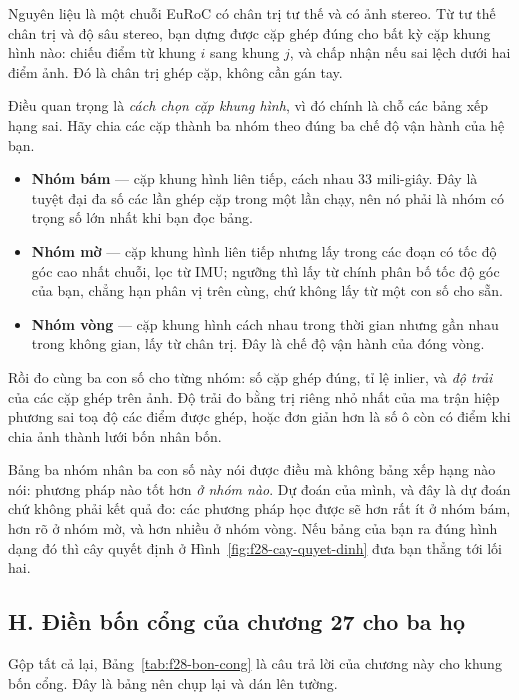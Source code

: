 \documentclass[../../deep_learning.tex]{subfiles}
\begin{document}
Nguyên liệu là một chuỗi EuRoC có chân trị tư thế và có ảnh stereo. Từ tư thế chân trị và độ sâu stereo, bạn dựng được cặp ghép đúng cho bất kỳ cặp khung hình nào: chiếu điểm từ khung \(i\) sang khung \(j\), và chấp nhận nếu sai lệch dưới hai điểm ảnh. Đó là chân trị ghép cặp, không cần gán tay.

Điều quan trọng là \emph{cách chọn cặp khung hình}, vì đó chính là chỗ các bảng xếp hạng sai. Hãy chia các cặp thành ba nhóm theo đúng ba chế độ vận hành của hệ bạn.

\begin{itemize}
\item \textbf{Nhóm bám} --- cặp khung hình liên tiếp, cách nhau 33 mili-giây. Đây là tuyệt đại đa số các lần ghép cặp trong một lần chạy, nên nó phải là nhóm có trọng số lớn nhất khi bạn đọc bảng.
\item \textbf{Nhóm mờ} --- cặp khung hình liên tiếp nhưng lấy trong các đoạn có tốc độ góc cao nhất chuỗi, lọc từ IMU; ngưỡng thì lấy từ chính phân bố tốc độ góc của bạn, chẳng hạn phân vị trên cùng, chứ không lấy từ một con số cho sẵn.
\item \textbf{Nhóm vòng} --- cặp khung hình cách nhau trong thời gian nhưng gần nhau trong không gian, lấy từ chân trị. Đây là chế độ vận hành của đóng vòng.
\end{itemize}

Rồi đo cùng ba con số cho từng nhóm: số cặp ghép đúng, tỉ lệ inlier, và \emph{độ trải} của các cặp ghép trên ảnh. Độ trải đo bằng trị riêng nhỏ nhất của ma trận hiệp phương sai toạ độ các điểm được ghép, hoặc đơn giản hơn là số ô còn có điểm khi chia ảnh thành lưới bốn nhân bốn.

Bảng ba nhóm nhân ba con số này nói được điều mà không bảng xếp hạng nào nói: phương pháp nào tốt hơn \emph{ở nhóm nào}. Dự đoán của mình, và đây là dự đoán chứ không phải kết quả đo: các phương pháp học được sẽ hơn rất ít ở nhóm bám, hơn rõ ở nhóm mờ, và hơn nhiều ở nhóm vòng. Nếu bảng của bạn ra đúng hình dạng đó thì cây quyết định ở Hình~\ref{fig:f28-cay-quyet-dinh} đưa bạn thẳng tới lối hai.

\subsection{H. Điền bốn cổng của chương 27 cho ba họ}
Gộp tất cả lại, Bảng~\ref{tab:f28-bon-cong} là câu trả lời của chương này cho khung bốn cổng. Đây là bảng nên chụp lại và dán lên tường.
\end{document}
